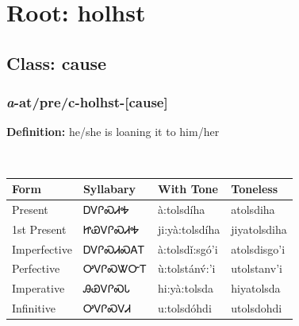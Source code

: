 \needspace{4in}
\section*{Root: holhst}
\nopagebreak
{}
\needspace{3in}
\subsection*{Class: cause}
\nopagebreak
\needspace{2in}
\subsubsection*{\textit{a}{-}at/pre/c{-}\textbf{holhst}{-}[cause]}
\nopagebreak
\textbf{Definition: } he/she is loaning it to him/her
\\[0.5em]
\begin{tabularx}{\textwidth}{l X X X}%
\toprule%
\textbf{Form}&\textbf{Syllabary}&\textbf{With Tone}&\textbf{Toneless}\\%
\midrule%
Present&ᎠᏙᎵᏍᏗᎭ&à:tolsdíha&atolsdiha\\%
1st Present&ᏥᏯᏙᎵᏍᏗᎭ&ji:yà:tolsdíha&jiyatolsdiha\\%
Imperfective&ᎠᏙᎵᏍᏗᏍᎪᎢ&à:tolsdǐ:sgó’i&atolsdisgo’i\\%
Perfective&ᎤᏙᎵᏍᏔᏅᎢ&ù:tolstánv́:’i&utolstanv’i\\%
Imperative&ᎯᏯᏙᎵᏍᏓ&hi:yà:tolsda&hiyatolsda\\%
Infinitive&ᎤᏙᎵᏍᏙᏗ&u:tolsdóhdi&utolsdohdi\\%
\bottomrule%
\end{tabularx}
\\[1em]